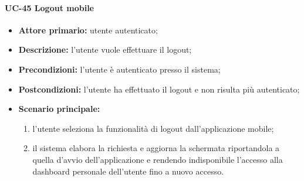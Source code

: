 \paragraph{UC-45 Logout mobile}

	\begin{itemize}
		\item \textbf{Attore primario:} utente autenticato;

		\item \textbf{Descrizione:} l'utente vuole effettuare il logout;

		\item \textbf{Precondizioni:} l'utente è autenticato presso il sistema;

		\item \textbf{Postcondizioni:} l'utente ha effettuato il logout e non risulta più autenticato;

		\item \textbf{Scenario principale:}
	  		\begin{enumerate}
		  		\item l'utente seleziona la funzionalità di logout dall'applicazione mobile;
		  		\item il sistema elabora la richiesta e aggiorna la schermata riportandola a quella d'avvio dell'applicazione e rendendo indisponibile l'accesso alla dashboard personale dell'utente fino a nuovo accesso.
	  		\end{enumerate}
	\end{itemize}
